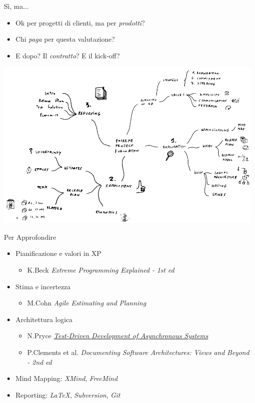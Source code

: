 \documentclass[compress, red, 14pt, pdf]{beamer}
\newcommand{\highlight}[1]{{\color{purple} \emph{#1}}}
\begin{document}
	\begin{frame}{Sì, ma...}
		\begin{itemize}
			\item Ok per progetti di clienti, ma per \highlight{prodotti}?
			\item Chi \highlight{paga} per questa valutazione?
			\item E dopo? Il \highlight{contratto}? E il kick-off?
		\end{itemize}
		\begin{center}
			\hspace*{-0.3cm} \includegraphics[scale=0.21]{images/takeaway}
		\end{center}
	\end{frame}
	
	\begin{frame}{Per Approfondire}
		\begin{itemize}	
			\item Pianificazione e valori in XP
				\begin{itemize}
					\item {\small K.Beck \highlight{Extreme Programming Explained - 1st ed}}
				\end{itemize}
			\item Stima e incertezza
				\begin{itemize}
					\item {\small M.Cohn \highlight{Agile Estimating and Planning}}
				\end{itemize}
			\item Architettura logica
				\begin{itemize}
					\item {\small N.Pryce \highlight{\href{http://www.natpryce.com/articles/000755.html}{Test-Driven Development of Asynchronous Systems}}}
					\item {\small P.Clements et al. \highlight{Documenting Software Architectures: Views and Beyond - 2nd ed}}
				\end{itemize}
		\end{itemize}
		
		\begin{itemize}
			\item Mind Mapping: \highlight{XMind}, \highlight{FreeMind}
			\item Reporting: \highlight{LaTeX}, \highlight{Subversion}, \highlight{Git}
		\end{itemize}
	\end{frame}
\end{document}

